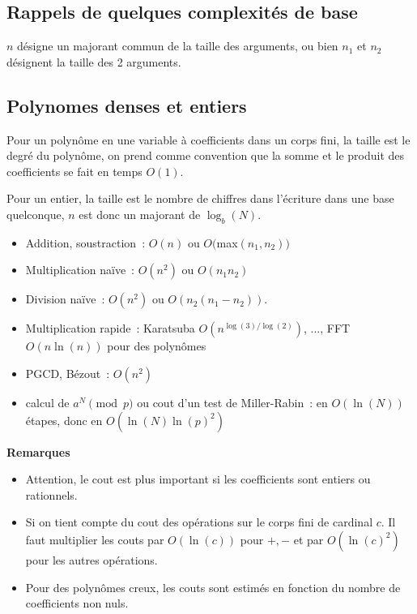 \documentclass[a4paper,11pt]{book}
\begin{document}
\begin{giacjshere}
\pagebreak

\section{Rappels de quelques complexit\'es de base}
$n$ d\'esigne un majorant commun de la taille des arguments, ou bien
$n_1$ et $n_2$ d\'esignent la taille des 2 arguments.

\subsection{Polynomes denses et entiers}
Pour un polyn\^ome en une variable
\`a coefficients dans un corps fini, la taille est
le degr\'e du polyn\^ome, on prend comme convention que
la somme et le produit des coefficients se fait en temps $O(1)$.

Pour un entier, la taille est le nombre de chiffres dans l'\'ecriture
dans une base quelconque, $n$ est donc un majorant de $\log_b(N)$.
\begin{itemize}
\item Addition, soustraction~: $O(n)$ ou $O($max$(n_1,n_2))$
\item Multiplication na\"ive~: $O(n^2)$ ou $O(n_1n_2)$
\item Division na\"ive~: $O(n^2)$ ou $O(n_2(n_1-n_2))$.
\item Multiplication rapide~: Karatsuba $O(n^{\log(3)/\log(2)})$, ..., FFT
$O(n\ln(n))$ pour des polyn\^omes
\item PGCD, B\'ezout~: $O(n^2)$
\item calcul de $a^N \pmod p$ ou cout d'un test de Miller-Rabin~: 
en $O(\ln(N))$ \'etapes, donc en $O(\ln(N)\ln(p)^2)$
\end{itemize}

{\bf Remarques}
\begin{itemize}
\item Attention, le cout est plus important si les coefficients sont entiers
ou rationnels. 
\item Si on tient compte du cout des op\'erations sur le corps fini
de cardinal $c$. Il faut multiplier les couts par $O(\ln(c))$ pour $+,-$
et par $O(\ln(c)^2)$ pour les autres op\'erations.
\item Pour des polyn\^omes creux, les couts sont
estim\'es en fonction du nombre de coefficients non nuls.
\end{itemize}



\end{giacjshere}
\end{document}
